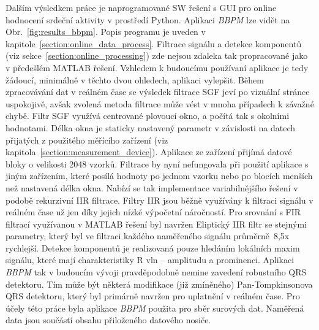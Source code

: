 Dalším výsledkem práce je naprogramované SW řešení s GUI pro online hodnocení
srdeční aktivity v prostředí Python. Aplikaci \textit{BBPM} lze vidět
na Obr.~\ref{fig:results_bbpm}. Popis programu je uveden v
kapitole~\ref{section:online_data_process}. Filtrace signálu a detekce
komponentů (viz sekce~\ref{section:online_processing}) zde nejsou zdaleka tak
propracované jako v předešlém MATLAB řešení. Vzhledem k budoucímu
používaní aplikace je tedy žádoucí, minimálně v těchto dvou ohledech, aplikaci
vylepšit. Během zpracovávání dat v reálném čase se výsledek filtrace SGF jeví po
vizuální stránce uspokojivě, avšak zvolená metoda filtrace může vést v mnoha
případech k závažné chybě. Filtr SGF využívá centrované plovoucí okno, a počítá
tak s okolními hodnotami. Délka okna je staticky nastavený parametr v závislosti
na datech přijatých z použitého měřícího zařízení (viz
kapitola~\ref{section:measurement_device}). Aplikace ze zařízení přijímá datové
bloky o velikosti 2048 vzorků. Filtrace by nyní nefungovala při použití aplikace
s jiným zařízením, které posílá hodnoty po jednom vzorku nebo po blocích menších
než nastavená délka okna. Nabízí se tak implementace variabilnějšího řešení v
podobě rekurzivní IIR filtrace. Filtry IIR jsou běžně využívány k filtraci
signálu v reálném čase už jen díky jejich nízké výpočetní náročností. Pro
srovnání s FIR filtrací využívanou v MATLAB řešení byl navržen
Eliptický IIR filtr se stejnými parametry, který byl ve filtraci každého
naměřeného signálu průměrně~8,5x rychlejší. Detekce komponentů je realizovaná
pouze hledáním lokálních maxim signálu, které mají charakteristiky R vln --
amplitudu a prominenci. Aplikaci \textit{BBPM} tak v budoucím vývoji
pravděpodobně nemine zavedení robustního QRS detektoru. Tím může být některá
modifikace (již zmíněného) Pan-Tompkinsonova QRS detektoru, který byl primárně
navržen pro uplatnění v reálném čase. Pro účely této práce byla aplikace
\textit{BBPM} použita pro sběr surových dat. Naměřená data jsou součástí obsahu
přiloženého datového nosiče.


